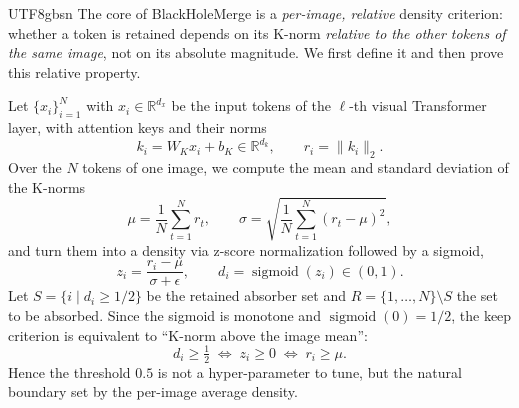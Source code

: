 \documentclass[10pt,twocolumn,letterpaper]{article}
\newcommand{\ours}{BlackHoleMerge}
\begin{document}
\begin{CJK}{UTF8}{gbsn}
The core of \ours{} is a \emph{per-image, relative} density criterion: whether a
token is retained depends on its K-norm \emph{relative to the other tokens of the
same image}, not on its absolute magnitude. We first define it and then prove
this relative property.

Let $\{x_i\}_{i=1}^{N}$ with $x_i\in\mathbb{R}^{d_x}$ be the input tokens of the
$\ell$-th visual Transformer layer, with attention keys and their norms
\begin{equation}
    k_i=W_Kx_i+b_K\in\mathbb{R}^{d_k},\qquad
    r_i=\lVert k_i\rVert_2 .
    \label{eq:key_norm}
\end{equation}
Over the $N$ tokens of one image, we compute the mean and standard deviation of
the K-norms
\begin{equation}
    \mu=\frac{1}{N}\sum_{t=1}^{N}r_t,\qquad
    \sigma=\sqrt{\frac{1}{N}\sum_{t=1}^{N}(r_t-\mu)^2},
    \label{eq:key_statistics}
\end{equation}
and turn them into a density via z-score normalization followed by a sigmoid,
\begin{equation}
    z_i=\frac{r_i-\mu}{\sigma+\epsilon},\qquad
    d_i=\operatorname{sigmoid}(z_i)\in(0,1).
    \label{eq:density}
\end{equation}
Let $S=\{i\mid d_i\ge 1/2\}$ be the retained absorber set and
$R=\{1,\dots,N\}\setminus S$ the set to be absorbed. Since the sigmoid is
monotone and $\operatorname{sigmoid}(0)=1/2$, the keep criterion is equivalent to
``K-norm above the image mean'':
\begin{equation}
    d_i\ge\tfrac12
    \;\Longleftrightarrow\; z_i\ge0
    \;\Longleftrightarrow\; r_i\ge\mu .
    \label{eq:threshold_equivalence}
\end{equation}
Hence the threshold $0.5$ is not a hyper-parameter to tune, but the natural
boundary set by the per-image average density.


\end{CJK}
\end{document}

